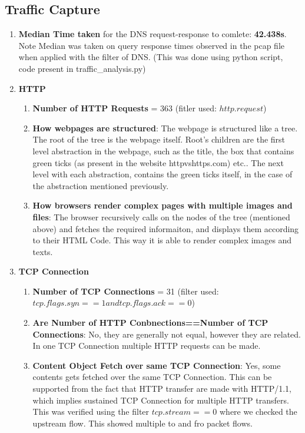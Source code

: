 \documentclass[12pt]{article}
\begin{document}
\subsection{Traffic Capture}
\renewcommand{\labelenumi}{\Alph{enumi}}
\begin{enumerate}
    \item \textbf{Median Time taken} for the DNS request-response to comlete: \textbf{42.438s}. Note Median was taken on query response times observed in the pcap file when applied with the filter of DNS. (This was done using python script, code present in traffic\_analysis.py)
    \item \textbf{HTTP}
    \begin{enumerate}
        \item \textbf{Number of HTTP Requests} = 363 (fitler used: $http.request$)
        \item \textbf{How webpages are structured}: The webpage is structured like a tree. The root of the tree is the webpage itself. Root's children are the first level abstraction in the webpage, such as the title, the box that contains green ticks (as present in the website httpvshttps.com) etc.. The next level with each abstraction, contains the green ticks itself, in the case of the abstraction mentioned previously. 
        \item \textbf{How browsers render complex pages with multiple images and files}: The browser recursively calls on the nodes of the tree (mentioned above) and fetches the required informaiton, and displays them according to their HTML Code. This way it is able to render complex images and texts. 
    \end{enumerate}
    \item \textbf{TCP Connection}
    \begin{enumerate}
        \item \textbf{Number of TCP Connections} = 31 (filter used: $tcp.flags.syn == 1 and tcp.flags.ack == 0$)
        \item \textbf{Are Number of HTTP Conbnections==Number of TCP Connections}: No, they are generally not equal, however they are related. In one TCP Connection multiple HTTP requests can be made.
        \item \textbf{Content Object Fetch over same TCP Connection}: Yes, some contents gets fetched over the same TCP Connection. This can be supported from the fact that HTTP transfer are made with HTTP/1.1, which implies sustained TCP Connection for multiple HTTP transfers. This was verified using the filter $tcp.stream == 0$ where we checked the upstream flow. This showed multiple to and fro packet flows.

\end{enumerate}
\end{enumerate}
\end{document}
